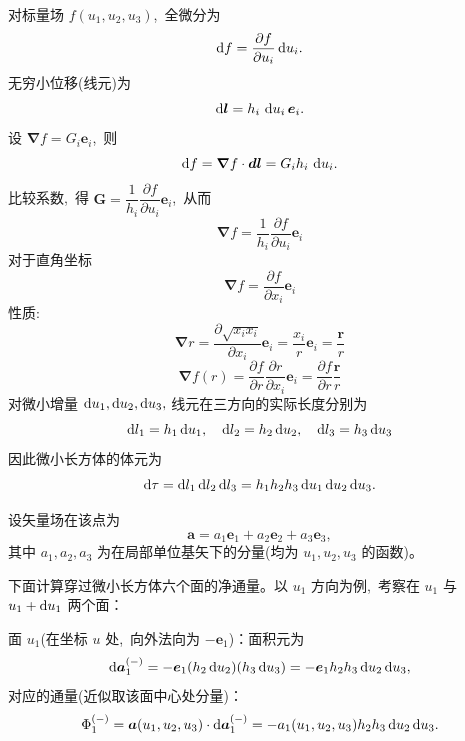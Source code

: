 对标量场 $f(u_1,u_2,u_3)$, \,全微分为
\[
\dif f = \frac{\partial f}{\partial u_i}\dif u_i.
\]
无穷小位移(线元)为
\[
\dif \boldsymbol l =  h_i\,\dif u_i\,{\boldsymbol e}_i.
\]
设 $\boldsymbol\nabla f = G_i {\boldsymbol e}_i$, \,则
\[
\dif f = \boldsymbol\nabla f\cdot\boldsymbol d\boldsymbol l
=G_i h_i\,\dif  u_i.
\]
比较系数, \,得 $\boldsymbol G = \dfrac{1}{h_i}\dfrac{\partial f}{\partial u_i}\boldsymbol e_i$, \,从而
\begin{equation}
\boldsymbol\nabla f =  \frac{1}{h_i}\frac{\partial f}{\partial u_i}{\boldsymbol e}_i\label{梯度}
\end{equation}
对于直角坐标
\begin{equation}
    \boldsymbol{\nabla} f=\frac{\partial f}{\partial x_i}\boldsymbol{e}_i
\end{equation}
性质:
\begin{equation}
    \boldsymbol{\nabla}r=\frac{\partial \sqrt{x_ix_i}}{\partial x_i}\boldsymbol{e}_i=\frac{ x_i}{ r}\boldsymbol{e}_i=\frac{\boldsymbol{r}}{r}
\end{equation}
\begin{equation}
    \boldsymbol{\nabla} f(r)=\frac{\partial f}{\partial r}\frac{\partial r}{\partial x_i}\boldsymbol{e}_i=\frac{\partial f}{\partial r}\frac{\boldsymbol{r}}{r}
\end{equation}
对微小增量 \(\dif u_1,\dif u_2,\dif u_3,\) 线元在三方向的实际长度分别为
\[
\dif l_1 = h_1\dif u_1,\quad \dif l_2 = h_2\dif u_2,\quad \dif l_3 = h_3\dif u_3
\]
因此微小长方体的体元为
\begin{equation}\label{eq:volume}
\dif \tau = \dif l_1 \dif l_2\dif l_3 
= h_1 h_2 h_3\dif u_1\dif u_2\dif u_3.
\end{equation}

设矢量场在该点为
\[
\boldsymbol a = a_1{\boldsymbol e}_1 + a_2{\boldsymbol e}_2 + a_3{\boldsymbol e}_3,
\]
其中 \(a_1,a_2,a_3\) 为在局部单位基矢下的分量(均为 \(u_1,u_2,u_3\) 的函数)。

下面计算穿过微小长方体六个面的净通量。以 \(u_1\) 方向为例, \,考察在 \(u_1\) 与 \(u_1+\dif u_1\) 两个面：

   面 \(u_1\)(在坐标 \(u\) 处, \,向外法向为 \(-{\boldsymbol e}_1\))：面积元为
  \[
  \dif \boldsymbol a_{1}^{(-)} = -{\boldsymbol e}_1(h_2 \dif u_2)(h_3 \dif u_3) = -{\boldsymbol e}_1h_2 h_3\dif u_2\dif u_3,
  \]
  对应的通量(近似取该面中心处分量)：
  \[
  \Phi_1^{(-)} = \boldsymbol a(u_1,u_2,u_3)\cdot \dif \boldsymbol a_{1}^{(-)}
  = -a_1(u_1,u_2,u_3)h_2 h_3\dif u_2\dif u_3.
  \]

